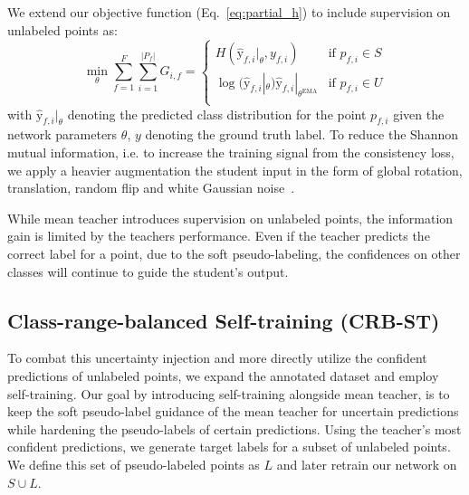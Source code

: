 \documentclass[10pt,twocolumn,letterpaper]{article}
\begin{document}
We extend our objective function (Eq.~\ref{eq:partial_h}) to include supervision on unlabeled points as:
\begin{equation} \label{eq:partial_consistency}
    \min_{\theta} \sum_{f=1}^{F}\sum_{i=1}^{|P_f|} G_{i,f}= 
    \begin{cases}
        H(\hat{\mathrm{y}}_{f,i}|_\theta, y_{f,i})
        & \textrm{if } p_{f,i}\in S \\
        \log(\hat{\mathrm{y}}_{f,i}|_\theta) \hat{\mathrm{y}}_{f,i}|_{\theta^\textrm{EMA}} & \textrm{if } p_{f,i}\in U \\
    \end{cases}
\end{equation}
with $\hat{\mathrm{y}}_{f,i}|_\theta$ denoting the predicted class distribution for the point $p_{f,i}$ given the network parameters $\theta$, $y$ denoting the ground truth label. To reduce the Shannon mutual information, i.e. to increase the training signal from the consistency loss, we apply a heavier augmentation the student input in the form of global rotation, translation, random flip and white Gaussian noise~\cite{arxiv2020fixmatch, arxiv2019mixmatch, cvpr2021pixmatch}.


While mean teacher introduces supervision on unlabeled points, the information gain is limited by the teachers performance. Even if the teacher predicts the correct label for a point, due to the soft pseudo-labeling, the confidences on other classes will continue to guide the student's output.

\subsection{Class-range-balanced Self-training (CRB-ST)} \label{sec:crb}

To combat this uncertainty injection and more directly utilize the confident predictions of unlabeled points, we expand the annotated dataset and employ self-training. 
Our goal by introducing self-training alongside mean teacher, is to keep the soft pseudo-label guidance of the mean teacher for uncertain predictions while hardening the pseudo-labels of certain predictions. Using the teacher's most confident predictions, we generate target labels for a subset of unlabeled points. We define this set of pseudo-labeled points as $L$ and later retrain our network on $S \cup L$.
\end{document}
